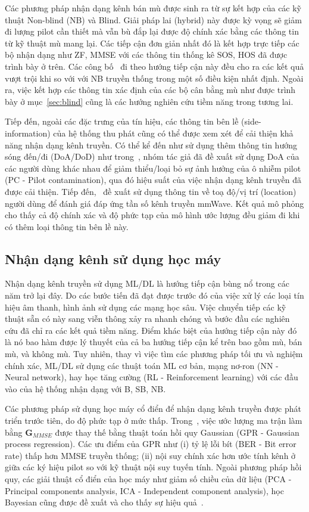 Các phương pháp nhận dạng kênh bán mù được sinh ra từ sự kết hợp của các kỹ thuật Non-blind (NB) và Blind. Giải pháp lai (hybrid) này được kỳ vọng sẽ giảm đi lượng pilot cần thiết mà vẫn bù đắp lại được độ chính xác bằng các thông tin từ kỹ thuật mù mang lại. Các tiếp cận đơn giản nhất đó là kết hợp trực tiếp các bộ nhận dạng như ZF, MMSE với các thông tin thống kê SOS, HOS đã được trình bày ở trên. Các công bố~\cite{Wan2008, Ladaycia2019, Rekik2021} đi theo hướng tiếp cận này đều cho ra các kết quả vượt trội khi so với với NB truyền thống trong một số điều kiện nhất định. Ngoài ra, việc kết hợp các thông tin xác định của các bộ cân bằng mù như được trình bày ở mục~\ref{sec:blind} cũng là các hướng nghiên cứu tiềm năng trong tương lai.

Tiếp đến, ngoài các đặc trưng của tín hiệu, các thông tin bên lề (side-information) của hệ thống thu phát cũng có thể được xem xét để cải thiện khả năng nhận dạng kênh truyền. Có thể kể đến như sử dụng thêm thông tin hướng sóng đến/đi (DoA/DoD) như trong~\cite{Wang2016}, nhóm tác giả đã đề xuất sử dụng DoA của các người dùng khác nhau để giảm thiểu/loại bỏ sự ảnh hưởng của ô nhiễm pilot (PC - Pilot contamination), qua đó hiệu suất của việc nhận dạng kênh truyền đã được cải thiện. Tiếp đến,~\cite{Lin2020} đề xuất sử dụng thông tin về toạ độ/vị trí (location) người dùng để đánh giá đáp ứng tần số kênh truyền mmWave. Kết quả mô phỏng cho thấy cả độ chính xác và độ phức tạp của mô hình ước lượng đều giảm đi khi có thêm loại thông tin bên lề này.

\subsection{Nhận dạng kênh sử dụng học máy}

Nhận dạng kênh truyền sử dụng ML/DL là hướng tiếp cận bùng nổ trong các năm trở lại đây. Do các bước tiến đã đạt được trước đó của việc xử lý các loại tín hiệu âm thanh, hình ảnh sử dụng các mạng học sâu. Việc chuyển tiếp các kỹ thuật sẵn có này sang viễn thông xảy ra nhanh chóng và bước đầu các nghiên cứu đã chỉ ra các kết quả tiềm năng. Điểm khác biệt của hướng tiếp cận này đó là nó bao hàm được lý thuyết của cả ba hướng tiếp cận kể trên bao gồm mù, bán mù, và không mù. Tuy nhiên, thay vì việc tìm các phương pháp tối ưu và nghiệm chính xác, ML/DL sử dụng các thuật toán ML cơ bản, mạng nơ-ron (NN - Neural network), hay học tăng cường (RL - Reinforcement learning) với các đầu vào của hệ thống nhận dạng với B, SB, NB.

Các phương pháp sử dụng học máy cổ điển để nhận dạng kênh truyền được phát triển trước tiên, do độ phức tạp ở mức thấp. Trong~\cite{Simeon2022}, việc ước lượng ma trận làm bằng $\mathbf{G}_{MMSE}$ được thay thế bằng thuật toán hồi quy Gaussian (GPR - Gaussian process regression). Các ưu điểm của GPR như (i) tỷ lệ lỗi bít (BER - Bit error rate) thấp hơn MMSE truyền thống; (ii) nội suy chính xác hơn ước tính kênh ở giữa các ký hiệu pilot so với kỹ thuật nội suy tuyến tính. Ngoài phương pháp hồi quy, các giải thuật cổ điển của học máy như giảm số chiều của dữ liệu (PCA - Principal components analysis, ICA - Independent component analysis), học Bayesian cũng được đề xuất và cho thấy sự hiệu quả~\cite{vilas2022}.

